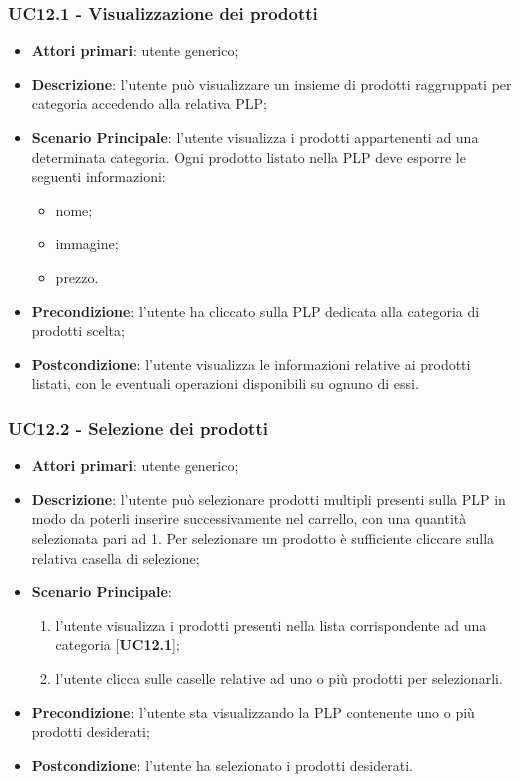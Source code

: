 \subsubsection{UC12.1 - Visualizzazione dei prodotti}
\begin{itemize}
\item \textbf{Attori primari}: utente generico;
\item \textbf{Descrizione}: l'utente può visualizzare un insieme di prodotti raggruppati per categoria accedendo alla relativa PLP;
\item \textbf{Scenario Principale}: l'utente visualizza i prodotti appartenenti ad una determinata categoria. Ogni prodotto listato nella PLP deve esporre le seguenti informazioni:
\begin{itemize}
\item nome;
\item immagine;
\item prezzo.
\end{itemize}
\item \textbf{Precondizione}: l'utente ha cliccato sulla PLP dedicata alla categoria di prodotti scelta;
\item \textbf{Postcondizione}: l'utente visualizza le informazioni relative ai prodotti listati, con le eventuali operazioni disponibili su ognuno di essi.
\end{itemize}

\subsubsection{UC12.2 - Selezione dei prodotti}
\begin{itemize}
\item \textbf{Attori primari}: utente generico;
\item \textbf{Descrizione}: l'utente può selezionare prodotti multipli presenti sulla PLP in modo da poterli inserire successivamente nel carrello, con una quantità selezionata pari ad 1. Per selezionare un prodotto è sufficiente cliccare sulla relativa casella di selezione;
\item \textbf{Scenario Principale}:
\begin{enumerate}
\item l'utente visualizza i prodotti presenti nella lista corrispondente ad una categoria [\textbf{UC12.1}];
\item l'utente clicca sulle caselle relative ad uno o più prodotti per selezionarli.
\end{enumerate}
\item \textbf{Precondizione}: l'utente sta visualizzando la PLP contenente uno o più prodotti desiderati;
\item \textbf{Postcondizione}: l'utente ha selezionato i prodotti desiderati.
\end{itemize}

